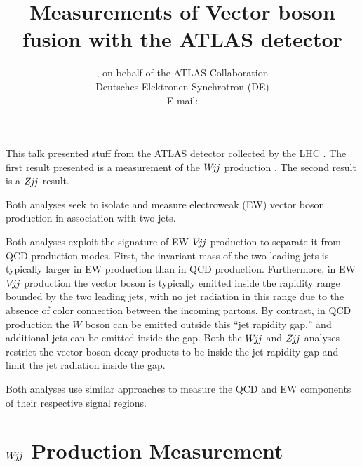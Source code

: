 \documentclass{PoS}
\title{Measurements of Vector boson fusion with the ATLAS detector}
\author{\speaker{Kurt Brendlinger},
        on behalf of the ATLAS Collaboration\\
       Deutsches Elektronen-Synchrotron (DE)\\
       E-mail: \email{kurt.brendlinger@cern.ch}}
\def\wjj{\ensuremath{W\kern -0.2em j\kern -0.1emj}\xspace}
\def\zjj{\ensuremath{Z\kern -0.1em j\kern -0.1emj}\xspace}
\def\vjj{\ensuremath{V\kern -0.2em j\kern -0.1emj}\xspace}
\def\w{\ensuremath{W}\xspace}
\def\mjj{\ensuremath{M_{jj}}}
\begin{document}
This talk presented stuff from the ATLAS detector \cite{Aad:2008zzm} collected by the
LHC \cite{Evans:2008zzb}.
The first result presented is a measurement of the \wjj production \cite{Aaboud:2017fye}.
The second result is a \zjj result.

Both analyses seek to isolate and measure electroweak (EW) vector boson production in association with
two jets.

Both analyses exploit the signature of EW \vjj production to separate it from QCD production modes.
First, the invariant mass of the two leading jets is typically larger in EW production than
in QCD production.
Furthermore, in EW \vjj production the vector boson is typically emitted inside the
rapidity range bounded by the two leading jets, with no jet radiation in this range due to the absence
of color connection between the incoming partons.
By contrast, in QCD production the \w boson can be emitted outside this ``jet rapidity gap,'' and
additional jets can be emitted inside the gap.
Both the \wjj and \zjj analyses restrict the vector boson decay products to be inside the jet rapidity
gap and limit the jet radiation inside the gap.


Both analyses use similar approaches to measure the QCD and EW components of their respective signal
regions.

\section{\wjj Production Measurement}
\end{document}
